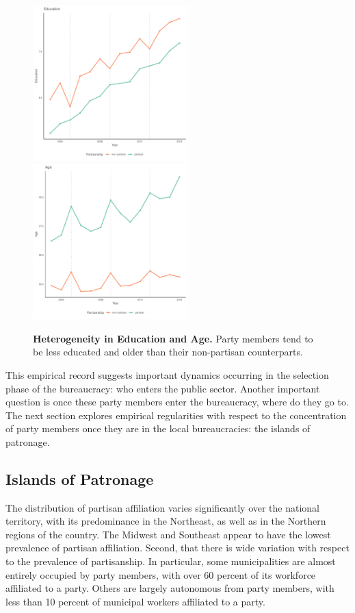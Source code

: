 \begin{figure}[H]
    \centering
    \includegraphics[width = 6cm, height = 6cm]{chapters/chapter_3/figures/partisanship/plot_edu_mean.pdf}
    \includegraphics[width = 6cm, height = 6cm]{chapters/chapter_3/figures/partisanship/plot_age_mean.pdf}
    \caption{\textbf{Heterogeneity in Education and Age.} Party members tend to be less educated and older than their non-partisan counterparts.}
    \label{fig:partisan_edu_et_age}
\end{figure}

This empirical record suggests important dynamics occurring in the selection phase of the bureaucracy: who enters the public sector. Another important question is once these party members enter the bureaucracy, where do they go to. The next section explores empirical regularities with respect to the concentration of party members once they are in the local bureaucracies: the islands of patronage.

\subsection{Islands of Patronage}
\label{sec:prevalence_patronage}

The distribution of partisan affiliation varies significantly over the national territory, with its predominance in the Northeast, as well as in the Northern regions of the country. The Midwest and Southeast appear to have the lowest prevalence of partisan affiliation. Second, that there is wide variation with respect to the prevalence of partisanship. In particular, some municipalities are almost entirely occupied by party members, with over 60 percent of its workforce affiliated to a party. Others are largely autonomous from party members, with less than 10 percent of municipal workers affiliated to a party.

